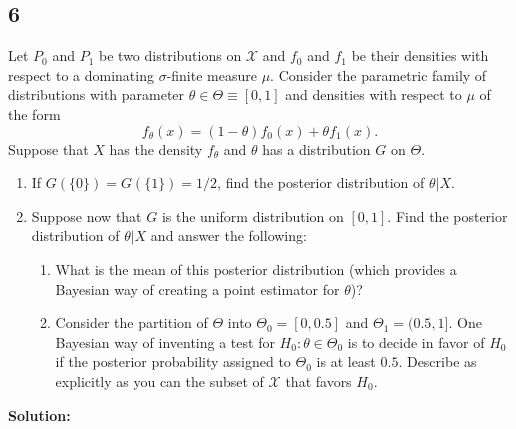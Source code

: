 \documentclass[12pt]{article}
\begin{document}
\subsection*{6}
\begin{tcolorbox}
  Let $P_0$ and $P_1$ be two distributions on $\mathcal{X}$ and $f_0$ and $f_1$ be their densities with respect to a dominating $\sigma$-finite
  measure $\mu$.  Consider the parametric family of distributions with parameter $\theta \in \Theta \equiv [0,1]$ and densities with respect to $\mu$
  of the form
  \[
    f_\theta(x) = (1-\theta) f_0(x) +\theta f_1(x).
  \]
  Suppose that $X$ has the density $f_\theta$ and $\theta$ has a distribution $G$ on $\Theta$.
  \begin{enumerate}
    \item If $G(\{0\})=G(\{1\})=1/2$, find the posterior distribution of $\theta|X$.
    \item Suppose now that $G$ is the uniform distribution on $[0,1]$.  Find the posterior distribution of $\theta|X$ and answer  the following:

      \begin{enumerate}
        \item What is the mean of this posterior distribution (which provides a Bayesian way of creating a point estimator for $\theta$)?
        \item Consider the partition of $\Theta$ into $\Theta_0=[0,0.5]$ and $\Theta_1=(0.5,1]$.  One Bayesian way of inventing a test for $H_0: \theta \in \Theta_0$ is to decide in favor of $H_0$ if the posterior probability assigned to $\Theta_0$ is at least $0.5$. Describe as explicitly as you can the subset of $\mathcal{X}$ that favors $H_0$.
      \end{enumerate}
  \end{enumerate}
\end{tcolorbox}

\textbf{Solution:}
\end{document}
